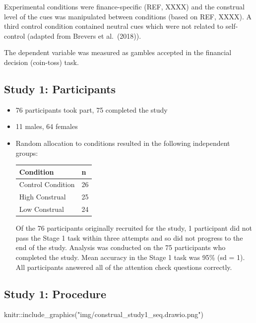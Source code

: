 \documentclass[
  letterpaper,
  DIV=11,
  numbers=noendperiod]{scrartcl}
\newenvironment{Shaded}{\begin{snugshade}}{\end{snugshade}}
\newcommand{\FunctionTok}[1]{\textcolor[rgb]{0.28,0.35,0.67}{#1}}
\newcommand{\NormalTok}[1]{\textcolor[rgb]{0.00,0.23,0.31}{#1}}
\newcommand{\SpecialCharTok}[1]{\textcolor[rgb]{0.37,0.37,0.37}{#1}}
\newcommand{\StringTok}[1]{\textcolor[rgb]{0.13,0.47,0.30}{#1}}
\begin{document}
Experimental conditions were finance-specific (REF, XXXX) and the
construal level of the cues was manipulated between conditions (based on
REF, XXXX). A third control condition contained neutral cues which were
not related to self-control (adapted from Brevers et al.~(2018)).

The dependent variable was measured as gambles accepted in the financial
decision (coin-toss) task.

\hypertarget{study-1-participants}{%
\subsection{Study 1: Participants}\label{study-1-participants}}

\begin{itemize}
\item
  76 participants took part, 75 completed the study
\item
  11 males, 64 females
\item
  Random allocation to conditions resulted in the following independent
  groups:

  \begin{longtable}[]{@{}ll@{}}
  \toprule()
  Condition & n \\
  \midrule()
  \endhead
  Control Condition & 26 \\
  High Construal & 25 \\
  Low Construal & 24 \\
  \bottomrule()
  \end{longtable}

  Of the 76 participants originally recruited for the study, 1
  participant did not pass the Stage 1 task within three attempts and so
  did not progress to the end of the study. Analysis was conducted on
  the 75 participants who completed the study. Mean accuracy in the
  Stage 1 task was 95\% (sd = 1). All participants answered all of the
  attention check questions correctly.
\end{itemize}

\hypertarget{study-1-procedure}{%
\subsection{Study 1: Procedure}\label{study-1-procedure}}

\begin{Shaded}
\begin{Highlighting}[]
\NormalTok{knitr}\SpecialCharTok{::}\FunctionTok{include\_graphics}\NormalTok{(}\StringTok{"img/construal\_study1\_seq.drawio.png"}\NormalTok{)}
\end{Highlighting}
\end{Shaded}
\end{document}
